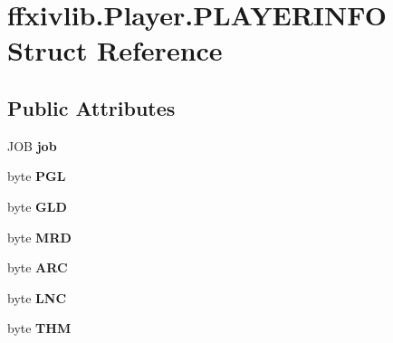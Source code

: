 \hypertarget{structffxivlib_1_1_player_1_1_p_l_a_y_e_r_i_n_f_o}{\section{ffxivlib.\-Player.\-P\-L\-A\-Y\-E\-R\-I\-N\-F\-O Struct Reference}
\label{structffxivlib_1_1_player_1_1_p_l_a_y_e_r_i_n_f_o}
}
\subsection*{Public Attributes}
\begin{DoxyCompactItemize}
\item 
\hypertarget{structffxivlib_1_1_player_1_1_p_l_a_y_e_r_i_n_f_o_aa9ae39735cc0854043e5098a392a11d0}{J\-O\-B {\bfseries job}}\label{structffxivlib_1_1_player_1_1_p_l_a_y_e_r_i_n_f_o_aa9ae39735cc0854043e5098a392a11d0}

\item 
\hypertarget{structffxivlib_1_1_player_1_1_p_l_a_y_e_r_i_n_f_o_a02da933d2d2a5fd52f48985c32766362}{byte {\bfseries P\-G\-L}}\label{structffxivlib_1_1_player_1_1_p_l_a_y_e_r_i_n_f_o_a02da933d2d2a5fd52f48985c32766362}

\item 
\hypertarget{structffxivlib_1_1_player_1_1_p_l_a_y_e_r_i_n_f_o_ae92ce14749b8bef22302c93f8b6fcc06}{byte {\bfseries G\-L\-D}}\label{structffxivlib_1_1_player_1_1_p_l_a_y_e_r_i_n_f_o_ae92ce14749b8bef22302c93f8b6fcc06}

\item 
\hypertarget{structffxivlib_1_1_player_1_1_p_l_a_y_e_r_i_n_f_o_a419071b0828fa14f989c7a658f77b581}{byte {\bfseries M\-R\-D}}\label{structffxivlib_1_1_player_1_1_p_l_a_y_e_r_i_n_f_o_a419071b0828fa14f989c7a658f77b581}

\item 
\hypertarget{structffxivlib_1_1_player_1_1_p_l_a_y_e_r_i_n_f_o_a8538e2e919f6735bd62c1e810148855f}{byte {\bfseries A\-R\-C}}\label{structffxivlib_1_1_player_1_1_p_l_a_y_e_r_i_n_f_o_a8538e2e919f6735bd62c1e810148855f}

\item 
\hypertarget{structffxivlib_1_1_player_1_1_p_l_a_y_e_r_i_n_f_o_a160d923c83dd5d1c3b94f0c402d92412}{byte {\bfseries L\-N\-C}}\label{structffxivlib_1_1_player_1_1_p_l_a_y_e_r_i_n_f_o_a160d923c83dd5d1c3b94f0c402d92412}

\item 
\hypertarget{structffxivlib_1_1_player_1_1_p_l_a_y_e_r_i_n_f_o_a19cfd8292fe579f506f0657f378af73c}{byte {\bfseries T\-H\-M}}\label{structffxivlib_1_1_player_1_1_p_l_a_y_e_r_i_n_f_o_a19cfd8292fe579f506f0657f378af73c}


\end{DoxyCompactItemize}
